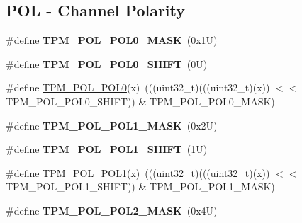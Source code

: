\subsection*{P\+OL -\/ Channel Polarity}
\begin{DoxyCompactItemize}
\item 
\mbox{\label{group___t_p_m___register___masks_ga9fcdee10cb45dcad8aab327b49b37274}} 
\#define {\bfseries T\+P\+M\+\_\+\+P\+O\+L\+\_\+\+P\+O\+L0\+\_\+\+M\+A\+SK}~(0x1\+U)
\item 
\mbox{\label{group___t_p_m___register___masks_ga4d48b4838b250911abe65f8a4f44f6d0}} 
\#define {\bfseries T\+P\+M\+\_\+\+P\+O\+L\+\_\+\+P\+O\+L0\+\_\+\+S\+H\+I\+FT}~(0\+U)
\item 
\#define \mbox{\hyperlink{group___t_p_m___register___masks_gaaaa83dec21e88499ea0f24262cf33acc}{T\+P\+M\+\_\+\+P\+O\+L\+\_\+\+P\+O\+L0}}(x)~(((uint32\+\_\+t)(((uint32\+\_\+t)(x)) $<$$<$ T\+P\+M\+\_\+\+P\+O\+L\+\_\+\+P\+O\+L0\+\_\+\+S\+H\+I\+FT)) \& T\+P\+M\+\_\+\+P\+O\+L\+\_\+\+P\+O\+L0\+\_\+\+M\+A\+SK)
\item 
\mbox{\label{group___t_p_m___register___masks_ga9086844811cbd6d3b145c15615ffeb79}} 
\#define {\bfseries T\+P\+M\+\_\+\+P\+O\+L\+\_\+\+P\+O\+L1\+\_\+\+M\+A\+SK}~(0x2\+U)
\item 
\mbox{\label{group___t_p_m___register___masks_ga456ad7191f7a102c240eade37156f41e}} 
\#define {\bfseries T\+P\+M\+\_\+\+P\+O\+L\+\_\+\+P\+O\+L1\+\_\+\+S\+H\+I\+FT}~(1\+U)
\item 
\#define \mbox{\hyperlink{group___t_p_m___register___masks_ga2d7e2b437b1feec6ffa2500eba9684fd}{T\+P\+M\+\_\+\+P\+O\+L\+\_\+\+P\+O\+L1}}(x)~(((uint32\+\_\+t)(((uint32\+\_\+t)(x)) $<$$<$ T\+P\+M\+\_\+\+P\+O\+L\+\_\+\+P\+O\+L1\+\_\+\+S\+H\+I\+FT)) \& T\+P\+M\+\_\+\+P\+O\+L\+\_\+\+P\+O\+L1\+\_\+\+M\+A\+SK)
\item 
\mbox{\label{group___t_p_m___register___masks_ga815df6c46ad9c26198d208d909b4ecdc}} 
\#define {\bfseries T\+P\+M\+\_\+\+P\+O\+L\+\_\+\+P\+O\+L2\+\_\+\+M\+A\+SK}~(0x4\+U)
\item 
\mbox{\label{group___t_p_m___register___masks_ga7252ff73c800f201fc6de1a8017afb2d}} 

\end{DoxyCompactItemize}

